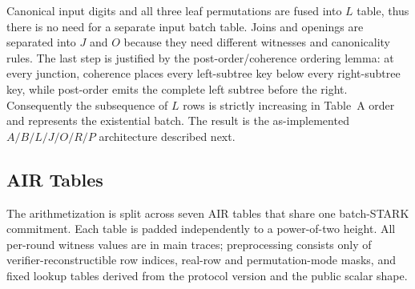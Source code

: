 \documentclass[11pt]{article}
\begin{document}
Canonical input digits and all three leaf permutations are fused into $L$ table, thus there is no need for a separate input batch table. Joins and openings are separated into $J$ and $O$ because they need different witnesses and canonicality rules. The last step is justified by the post-order/coherence ordering lemma: at every junction, coherence places every left-subtree key below every right-subtree key, while post-order emits the complete left subtree before the right. Consequently the subsequence of $L$ rows is strictly increasing in Table~A order and represents the existential batch. The result is the as-implemented $A/B/L/J/O/R/P$ architecture described next.

\subsection{AIR Tables}

The arithmetization is split across seven AIR tables that share one batch-STARK commitment. Each table is padded independently to a power-of-two height. All per-round witness values are in main traces; preprocessing consists only of verifier-reconstructible row indices, real-row and permutation-mode masks, and fixed lookup tables derived from the protocol version and the public scalar shape.
\end{document}
